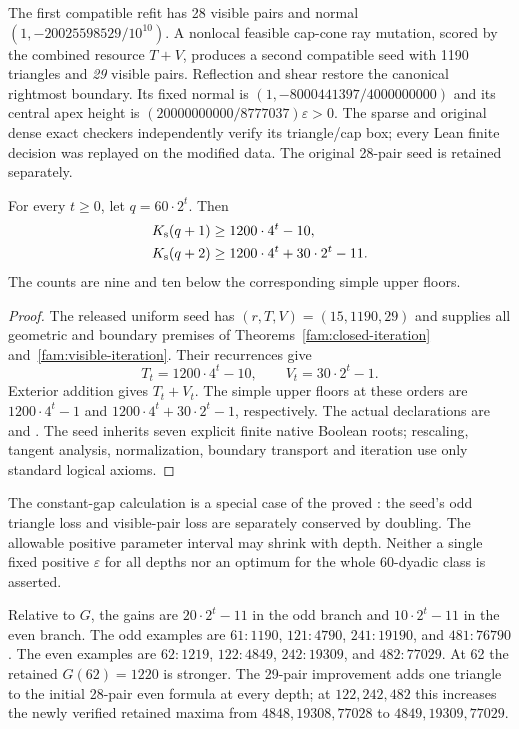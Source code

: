 The first compatible refit has 28 visible pairs and normal
$(1,-20025598529/10^{10})$. A nonlocal feasible cap-cone ray mutation,
scored by the combined resource $T+V$, produces a second compatible
seed with 1190 triangles and \emph{29} visible pairs. Reflection and
shear restore the canonical rightmost boundary. Its fixed normal is
$(1,-8000441397/4000000000)$ and its central apex height is
$(20000000000/8777037)\varepsilon>0$. The sparse and original dense exact
checkers independently verify its triangle/cap box; every Lean finite
decision was replayed on the modified data. The original 28-pair seed
is retained separately.

\begin{theorem}\label{fam:61-complete}
For every $t\ge0$, let $q=60\cdot2^t$. Then
\begin{align}
 K_{\mathrm{s}}(q+1)&\ge1200\cdot4^t-10,\label{fam:61-odd}\\
 K_{\mathrm{s}}(q+2)&\ge1200\cdot4^t+30\cdot2^t-11.\label{fam:61-even}
\end{align}
The counts are nine and ten below the corresponding simple upper floors.
\end{theorem}
\begin{proof}
The released uniform seed has $(r,T,V)=(15,1190,29)$ and supplies all
geometric and boundary premises of Theorems~\ref{fam:closed-iteration}
and~\ref{fam:visible-iteration}. Their recurrences give
\[
 T_t=1200\cdot4^t-10,\qquad V_t=30\cdot2^t-1.
\]
Exterior addition gives $T_t+V_t$. The simple upper floors at these
orders are $1200\cdot4^t-1$ and
$1200\cdot4^t+30\cdot2^t-1$, respectively. The actual declarations are
and .
The seed inherits seven explicit finite native Boolean roots; rescaling,
tangent analysis, normalization, boundary transport and iteration use
only standard logical axioms.
\end{proof}

The constant-gap calculation is a special case of the proved
: the seed's odd triangle loss and visible-pair
loss are separately conserved by doubling. The allowable positive
parameter interval may shrink with depth. Neither a single fixed
positive $\varepsilon$ for all depths nor an optimum for the whole
60-dyadic class is asserted.

Relative to $G$, the gains are $20\cdot2^t-11$ in the odd branch and
$10\cdot2^t-11$ in the even branch. The odd examples are
$61:1190$, $121:4790$, $241:19190$, and $481:76790$.
The even examples are $62:1219$, $122:4849$, $242:19309$, and
$482:77029$. At 62 the retained $G(62)=1220$ is stronger.
The 29-pair improvement adds one triangle to the initial 28-pair even
formula at every depth; at $122,242,482$ this increases the newly
verified retained maxima from $4848,19308,77028$ to $4849,19309,77029$.

